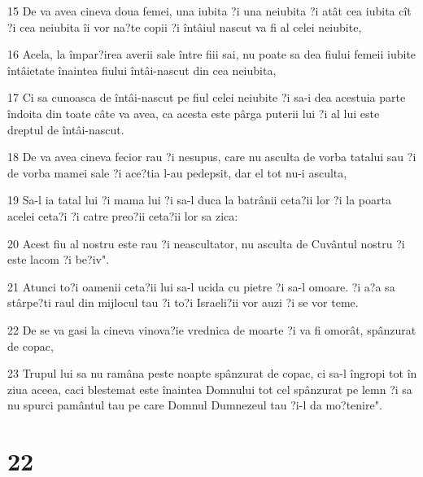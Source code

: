 \par 15 De va avea cineva doua femei, una iubita ?i una neiubita ?i atât cea iubita cît ?i cea neiubita îi vor na?te copii ?i întâiul nascut va fi al celei neiubite,
\par 16 Acela, la împar?irea averii sale între fiii sai, nu poate sa dea fiului femeii iubite întâietate înaintea fiului întâi-nascut din cea neiubita,
\par 17 Ci sa cunoasca de întâi-nascut pe fiul celei neiubite ?i sa-i dea acestuia parte îndoita din toate câte va avea, ca acesta este pârga puterii lui ?i al lui este dreptul de întâi-nascut.
\par 18 De va avea cineva fecior rau ?i nesupus, care nu asculta de vorba tatalui sau ?i de vorba mamei sale ?i ace?tia l-au pedepsit, dar el tot nu-i asculta,
\par 19 Sa-l ia tatal lui ?i mama lui ?i sa-l duca la batrânii ceta?ii lor ?i la poarta acelei ceta?i ?i catre preo?ii ceta?ii lor sa zica:
\par 20 Acest fiu al nostru este rau ?i neascultator, nu asculta de Cuvântul nostru ?i este lacom ?i be?iv".
\par 21 Atunci to?i oamenii ceta?ii lui sa-l ucida cu pietre ?i sa-l omoare. ?i a?a sa stârpe?ti raul din mijlocul tau ?i to?i Israeli?ii vor auzi ?i se vor teme.
\par 22 De se va gasi la cineva vinova?ie vrednica de moarte ?i va fi omorât, spânzurat de copac,
\par 23 Trupul lui sa nu ramâna peste noapte spânzurat de copac, ci sa-l îngropi tot în ziua aceea, caci blestemat este înaintea Domnului tot cel spânzurat pe lemn ?i sa nu spurci pamântul tau pe care Domnul Dumnezeul tau ?i-l da mo?tenire".

\chapter{22}

